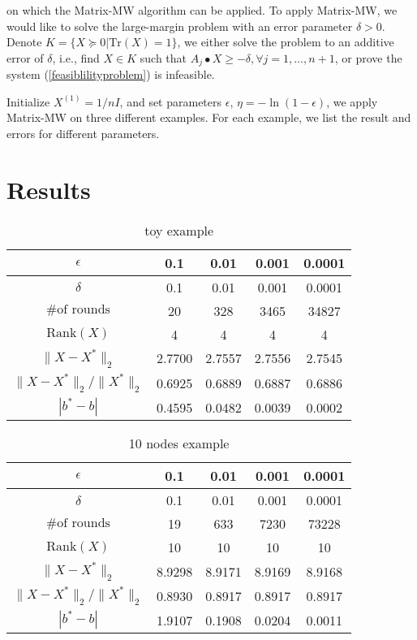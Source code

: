 \documentclass[12pt]{article}
\begin{document}
on which the Matrix-MW algorithm can be applied. To apply Matrix-MW, we would like to solve the large-margin problem with an error parameter $\delta >0$. Denote $K = \{X \succeq 0 | \text{Tr}(X) = 1\}$, we either solve the problem to an additive error of $\delta$, i.e., find $X \in K$ such that $A_j \bullet X  \geqslant -\delta,  \forall j = 1,\dots, n+1$, or prove the system (\ref{feasiblilityproblem}) is infeasible.


Initialize $X^{(1)} = 1/n I$, and set parameters $\epsilon$, $\eta = -\ln(1-\epsilon)$, we apply Matrix-MW on three different examples. For each example, we list the result and errors for different parameters.




\section{Results}
\begin{table}[htbp]\label{toytable}
\centering
\begin{tabular}{||c|c|c|c|c||}
\hline
$\epsilon$ & 0.1 & 0.01 & 0.001 & 0.0001 \\
\hline
$\delta$ & 0.1 & 0.01 & 0.001 & 0.0001 \\
\hline
$\text{\# of rounds}$ & 20 & 328 & 3465  & 34827 \\
\hline
$\text{Rank} (X)$ & 4 & 4 & 4 & 4 \\
\hline
$\|X - X^*\|_2$ & 2.7700 & 2.7557 & 2.7556 & 2.7545 \\
\hline
$\|X - X^*\|_2 / \|X^*\|_2$ & 0.6925   & 0.6889 & 0.6887 & 0.6886\\
\hline
$|b^* - b|$ & 0.4595 & 0.0482 & 0.0039 & 0.0002 \\
\hline
\end{tabular}
\caption{toy example}
\end{table}

\begin{table}[htbp]\label{10nodestable}
\centering

\begin{tabular}{||c|c|c|c|c||}
\hline
$\epsilon$ & 0.1 & 0.01 & 0.001 & 0.0001 \\
\hline
$\delta$ & 0.1 & 0.01 & 0.001 & 0.0001 \\
\hline
$\text{\# of rounds}$ & 19 & 633 & 7230 & 73228 \\
\hline
$\text{Rank} (X)$ & 10 & 10 & 10 & 10 \\
\hline
$\|X - X^*\|_2$ & 8.9298 & 8.9171 & 8.9169 & 8.9168 \\
\hline
$\|X - X^*\|_2 / \|X^*\|_2$ & 0.8930 & 0.8917 & 0.8917 & 0.8917 \\
\hline
$|b^* - b|$ & 1.9107 & 0.1908 & 0.0204 & 0.0011 \\
\hline
\end{tabular}
\caption{10 nodes example}
\end{table}
\end{document}
